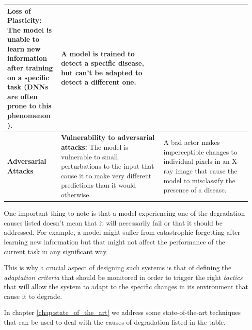\documentclass[../main.tex]{subfiles}
\begin{document}
\begin{table}[t]
{\begin{tabular}{p{0.22\linewidth} | p{0.42\linewidth} | p{0.41\linewidth}}
            \textbf{Loss of Plasticity:} The model is unable to learn new information after training on a specific task (DNNs are often prone to this phenomenon \cite{parisi_continual_2019}).
            & \footnotesize
            A model is trained to detect a specific disease, but can't be adapted to detect a different one. \\
        \midrule
            \small \textbf{Adversarial Attacks} & \footnotesize
            \textbf{Vulnerability to adversarial attacks:}  The model is vulnerable to small perturbations to the input that cause it to make very different predictions than it would otherwise.
            & \footnotesize
            A bad actor makes imperceptible changes to individual pixels in an X-ray image that cause the model to misclassify the presence of a disease. \\
        \bottomrule
        \end{tabular}
    }
    \end{table}

    One important thing to note is that a model experiencing one of the degradation causes listed doesn't mean that it will necessarily fail or that it should be addressed. For example, a model might suffer from catastrophic forgetting after learning new information but that might not affect the performance of the current task in any significant way.
    
    This is why a crucial aspect of designing such systems is that of defining the \textit{adaptation criteria} that should be monitored in order to trigger the right \textit{tactics} that will allow the system to adapt to the specific changes in its environment that cause it to degrade.
    

    In chapter \ref{chap:state_of_the_art} we address some state-of-the-art techniques that can be used to deal with the causes of degradation listed in the table. 
\end{document}
